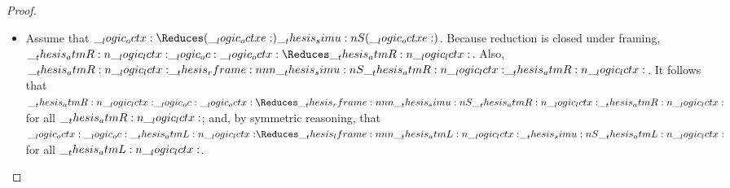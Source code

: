 \begin{proof}
\begin{itemize}
  \item 
  Assume that $\octx \Reduces (\octxe) \simu{S} (\octxe)$.
  Because reduction is closed under framing, $\atmR{\lctx} \oc \octx \Reduces \atmR{\lctx}$.
  Also, $\atmR{\lctx} \rframe{\simu{S}}{\atmR{\lctx}} \atmR{\lctx}$.
  It follows that $\atmR{\lctx} \oc \octx \Reduces\rframe{\simu{S}}{\atmR{\lctx}} \atmR{\lctx}$ for all $\__thesis_atmR:n {\__logic_lctx:}$; and, by symmetric reasoning, that $\octx \oc \atmL{\lctx} \Reduces\lframe{\atmL{\lctx}}{\simu{S}} \atmL{\lctx}$ for all $\__thesis_atmL:n {\__logic_lctx:}$.
  \qedhere
  \end{itemize}
\end{proof}

